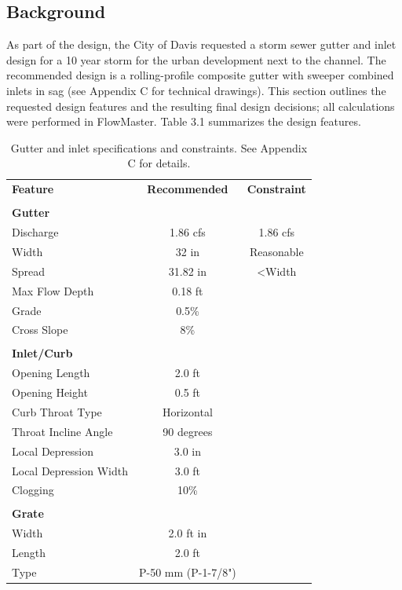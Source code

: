 \documentclass[11pt,letterpaper,final]{report}
\begin{document}
\begin{flushleft}
\setcounter{figure}{0}
\setcounter{section}{0}
\setcounter{table}{0}
\chapter{Background}


As part of the design, the City of Davis requested a storm sewer gutter and inlet design for a 10 year storm for the urban development next to the channel. The recommended design is a rolling-profile composite gutter with sweeper combined inlets in sag (see Appendix C for technical drawings). This section outlines the requested design features and the resulting final design decisions; all calculations were performed in FlowMaster. Table 3.1 summarizes the design features.

\begin{table}[H]
\centering
\caption{Gutter and inlet specifications and constraints. See Appendix C for details.}
\begin{tabular}{lcc}
\textbf{Feature}&\textbf{Recommended}&\textbf{Constraint}\\ \\
\textbf{Gutter}&&\\
\hline
Discharge&1.86 cfs&1.86 cfs\\
Width& 32 in & Reasonable\\
Spread & 31.82 in& <Width\\
Max Flow Depth& 0.18 ft & \\
Grade & 0.5\%&\\
Cross Slope& 8\%& \\ \\
\textbf{Inlet/Curb}&&\\
\hline
Opening Length&2.0 ft&\\
Opening Height& 0.5 ft&\\
Curb Throat Type&Horizontal&\\
Throat Incline Angle&90 degrees&\\
Local Depression & 3.0 in& \\
Local Depression Width & 3.0 ft &\\
Clogging&10\%&\\ \\
\textbf{Grate}&&\\
\hline
Width& 2.0 ft in& \\
Length & 2.0 ft &\\
Type&P-50 mm (P-1-7/8")&\\ \hline
\end{tabular}
\end{table}

\end{flushleft}
\end{document}
